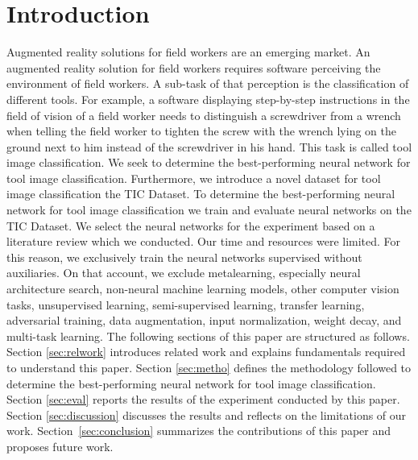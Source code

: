 \documentclass[a4paper, 10pt, journal]{wissarbIEEE}
\begin{document}
\section{Introduction}
\label{sec:intro}
Augmented reality solutions for field workers are an emerging market.\cite{EY.2019a, EY.2019b, Detzel.2018, Shook.2019, Guy.2019} An augmented reality solution for field workers requires software perceiving the environment of field workers. A sub-task of that perception is the classification of different tools. For example, a software displaying step-by-step instructions in the field of vision of a field worker needs to distinguish a screwdriver from a wrench when telling the field worker to tighten the screw with the wrench lying on the ground next to him instead of the screwdriver in his hand. This task is called tool image classification. We seek to determine the best-performing neural network for tool image classification. Furthermore, we introduce a novel dataset for tool image classification the TIC Dataset. To determine the best-performing neural network for tool image classification we train and evaluate neural networks on the TIC Dataset. We select the neural networks for the experiment based on a literature review which we conducted. Our time and resources were limited. For this reason, we exclusively train the neural networks supervised without auxiliaries. On that account, we exclude metalearning, especially neural architecture search, non-neural machine learning models, other computer vision tasks, unsupervised learning, semi-supervised learning, transfer learning, adversarial training, data augmentation, input normalization, weight decay, and multi-task learning. The following sections of this paper are structured as follows. Section \ref{sec:relwork} introduces related work and explains fundamentals required to understand this paper. Section \ref{sec:metho} defines the methodology followed to determine the best-performing neural network for tool image classification. Section \ref{sec:eval} reports the results of the experiment conducted by this paper. Section \ref{sec:discussion} discusses the results and reflects on the limitations of our work. Section~\ref{sec:conclusion} summarizes the contributions of this paper and proposes future work.
\end{document}

